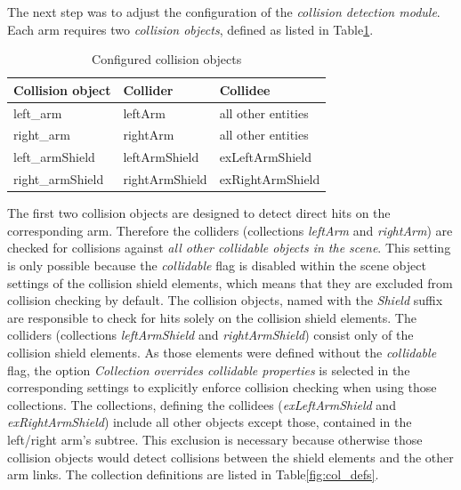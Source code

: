 The next step was to adjust the configuration of the \emph{collision detection module}. Each arm requires two \emph{collision objects}, defined as listed in Table\ref{fig:col_groups}. 
\begin{table}
  \centering
  \begin{tabular}[h]{|l|l|l|} \hline
	\textbf{Collision object} & \textbf{Collider} & \textbf{Collidee} \\ \hline
	left\_arm & leftArm & all other entities \\
	right\_arm & rightArm & all other entities \\
	left\_armShield & leftArmShield & exLeftArmShield \\
	right\_armShield & rightArmShield & exRightArmShield \\ \hline
  \end{tabular}
  \caption{Configured collision objects}
  \label{fig:col_groups}
\end{table}
The first two collision objects are designed to detect direct hits on the corresponding arm.  
Therefore the colliders (collections \emph{leftArm} and \emph{rightArm}) are checked for collisions against \emph{all other collidable objects in the scene}. This setting is only possible because the \emph{collidable} flag is disabled within the scene object settings of the collision shield elements, which means that they are excluded from collision checking by default. The collision objects, named with the \emph{Shield} suffix are responsible to check for hits solely on the collision shield elements. The colliders (collections \emph{leftArmShield} and \emph{rightArmShield}) consist only of the collision shield elements. As those elements were defined without the \emph{collidable} flag, the option \emph{Collection overrides collidable properties} is selected in the corresponding settings to explicitly enforce collision checking when using those collections. The collections, defining the collidees (\emph{exLeftArmShield} and \emph{exRightArmShield}) include all other objects except those, contained in the left/right arm's subtree. This exclusion is necessary because otherwise those collision objects would detect collisions between the shield elements and the other arm links. The collection definitions are listed in Table\ref{fig:col_defs}.
